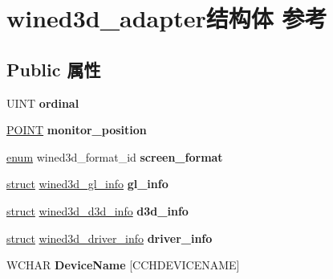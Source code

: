 \hypertarget{structwined3d__adapter}{}\section{wined3d\+\_\+adapter结构体 参考}
\label{structwined3d__adapter}
\subsection*{Public 属性}
\begin{DoxyCompactItemize}
\item 
\mbox{\label{structwined3d__adapter_a763a6405b5f16f01577928b10d3ab068}} 
U\+I\+NT {\bfseries ordinal}
\item 
\mbox{\label{structwined3d__adapter_ad8a034293200cdfc0f27960b287ca6b9}} 
\hyperlink{structtag_p_o_i_n_t}{P\+O\+I\+NT} {\bfseries monitor\+\_\+position}
\item 
\mbox{\label{structwined3d__adapter_a85570f7eb05dae44272d3ae462b1e81e}} 
\hyperlink{interfaceenum}{enum} wined3d\+\_\+format\+\_\+id {\bfseries screen\+\_\+format}
\item 
\mbox{\label{structwined3d__adapter_a10d69159eb3f4ac921ff712a9674ff99}} 
\hyperlink{interfacestruct}{struct} \hyperlink{structwined3d__gl__info}{wined3d\+\_\+gl\+\_\+info} {\bfseries gl\+\_\+info}
\item 
\mbox{\label{structwined3d__adapter_a1df739bb58811c229d3586c6bfcb395f}} 
\hyperlink{interfacestruct}{struct} \hyperlink{structwined3d__d3d__info}{wined3d\+\_\+d3d\+\_\+info} {\bfseries d3d\+\_\+info}
\item 
\mbox{\label{structwined3d__adapter_a152f3271491abd4729bacd18b5f768b9}} 
\hyperlink{interfacestruct}{struct} \hyperlink{structwined3d__driver__info}{wined3d\+\_\+driver\+\_\+info} {\bfseries driver\+\_\+info}
\item 
\mbox{\label{structwined3d__adapter_a1e8e2ee0bbc3ac1ee91a422996ff357b}} 
W\+C\+H\+AR {\bfseries Device\+Name} \mbox{[}C\+C\+H\+D\+E\+V\+I\+C\+E\+N\+A\+ME\mbox{]}
\item 

\end{DoxyCompactItemize}
